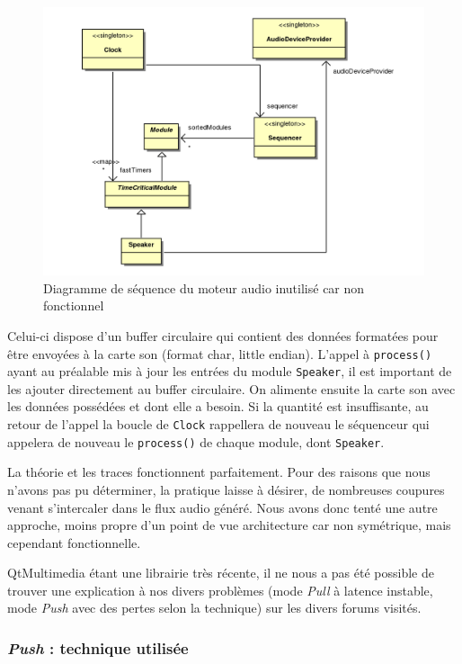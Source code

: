 \begin{figure}[htb]
\centering
\includegraphics[width=17cm]{../img/ps/psm_unusedAudioEngine.pdf}
\caption{Diagramme de séquence du moteur audio inutilisé car non fonctionnel}
\end{figure}
Celui-ci dispose d'un buffer circulaire qui contient des données
formatées pour être envoyées à la carte son (format char, little
endian). L'appel à \verb!process()! ayant au préalable mis à jour
les entrées du module \verb!Speaker!, il est important de les
ajouter directement au buffer circulaire. On alimente ensuite la
carte son avec les données possédées et dont elle a besoin. Si la
quantité est insuffisante, au retour de l'appel la boucle de
\verb!Clock! rappellera de nouveau le séquenceur qui appelera de
nouveau le \verb!process()! de chaque module, dont \verb!Speaker!.

La théorie et les traces fonctionnent parfaitement. Pour des
raisons que nous n'avons pas pu déterminer, la pratique laisse à
désirer, de nombreuses coupures venant s'intercaler dans le flux
audio généré. Nous avons donc tenté une autre approche, moins
propre d'un point de vue architecture car non symétrique, mais
cependant fonctionnelle.

QtMultimedia étant une librairie très récente, il ne nous a pas été
possible de trouver une explication à nos divers problèmes (mode
\emph{Pull} à latence instable, mode \emph{Push} avec des pertes
selon la technique) sur les divers forums visités.

\subsubsection{\emph{Push} : technique utilisée}

